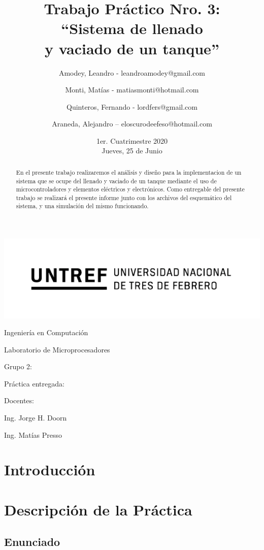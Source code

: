 \documentclass[a4paper]{article}
\title{Trabajo Práctico Nro. 3:\\``Sistema de llenado\\y vaciado de un tanque''}
\author{Amodey, Leandro - leandroamodey@gmail.com
\and Monti, Matías - matiasmonti@hotmail.com
\and Quinteros, Fernando - lordfers@gmail.com
\and Araneda, Alejandro – eloscurodeefeso@hotmail.com}
\date{1er. Cuatrimestre 2020\\Jueves, 25 de Junio}
\def\teacher{Ing. Jorge H. Doorn
\and Ing. Matías Presso}
\begin{document}

\begin{titlepage}\renewcommand\and\par\centering\makeatletter
    \includegraphics{logo.png}\par
    {\Large Ingeniería en Computación \par}\vspace{0.5cm}
    {\LARGE Laboratorio de Microprocesadores \par}\vfill
    {\huge \@title \par}\vfill
    Grupo 2:\par
    \@author\vfill
    Práctica entregada:\par
    \@date\vfill
    Docentes:\par
    \teacher\vspace{1cm}\makeatother
\end{titlepage}

\begin{abstract}

    En el presente trabajo realizaremos el análisis y diseño para la implementacion
    de un sistema que se ocupe del llenado y vaciado de un tanque mediante el uso de 
    microcontroladores y elementos eléctrìcos y electrónicos.
    Como entregable del presente trabajo se realizará el presente informe junto con los archivos 
    del esquemático del sistema, y una simulación del mismo funcionando.

\end{abstract}

\section{Introducción}


\section{Descripción de la Práctica}

\subsection{Enunciado}
\end{document}
